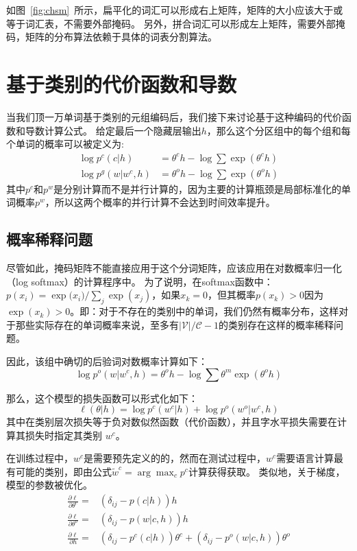 如图~\ref{fig:chsm}~所示，扁平化的词汇可以形成右上矩阵，矩阵的大小应该大于或等于词汇表，不需要外部掩码。
另外，拼合词汇可以形成左上矩阵，需要外部掩码，矩阵的分布算法依赖于具体的词表分割算法。

\section{基于类别的代价函数和导数}
当我们顶一万单词基于类别的元组编码后，我们接下来讨论基于这种编码的代价函数和导数计算公式。
给定最后一个隐藏层输出$ h $，那么这个分区组中的每个组和每个单词的概率可以被定义为:
\begin{equation}
\begin{split}
\log p^c(c|h) &= \theta^c h-\log \sum{\exp( \theta^c h )} \\
\log p^g(w|w^c,h)&=\theta^o h -\log\sum\exp{(\theta^o h)}
\end{split}
\end{equation}
其中$ p ^ c $和$ p ^ w $是分别计算而不是并行计算的，因为主要的计算瓶颈是局部标准化的单词概率$ p ^ w $，所以这两个概率的并行计算不会达到时间效率提升。

\subsection{概率稀释问题}
尽管如此，掩码矩阵不能直接应用于这个分词矩阵，应该应用在对数概率归一化（log softmax）的计算程序中。 为了说明，在softmax函数中：$ p(x_i)= {\exp({x_i}})/ {\sum_j \exp(x_j)} $，如果$ x_k = 0 $，但其概率$ p(x_k)> 0$因为$\exp(x_k)> 0 $。即：对于不存在的类别中的单词，我们仍然有概率分布，这样对于那些实际存在的单词概率来说，至多有$\mathcal{|V|/\mathcal{C}-1}$的类别存在这样的概率稀释问题。

 因此，该组中确切的后验词对数概率计算如下：
\begin{equation}
  \log p^o(w|w^c,h)=\theta^o h -\log\sum\theta^m\exp(\theta^o h)
\end{equation}

那么，这个模型的损失函数可以形式化如下：
\begin{equation}
\ell(\theta|h) =\log p^c(w^c|h) +\log p^o(w^o|w^c,h)
\end{equation}
其中在类别层次损失等于负对数似然函数（代价函数），并且字水平损失需要在计算其损失时指定其类别 $ w ^ c $。

在训练过程中，$ w ^ c $是需要预先定义的的，然而在测试过程中，$w^c$需要语言计算最有可能的类别，即由公式$\tilde w^c=\arg\max_c p^c$计算获得获取。 类似地，关于梯度，模型的参数被优化。
\begin{equation}
\begin{split}
\frac{\partial \ell}{\partial \theta^c}=& (\delta_{ij}-p(c|h))h \\
\frac{\partial \ell}{\partial \theta^o}=&(\delta_{ij}-p(w|c,h))h \\
\frac{\partial \ell}{\partial h}=&(\delta_{ij}-p^c(c|h))\theta^c + (\delta_{ij}-p^o(w|c,h))\theta^o
\end{split}
\end{equation}

